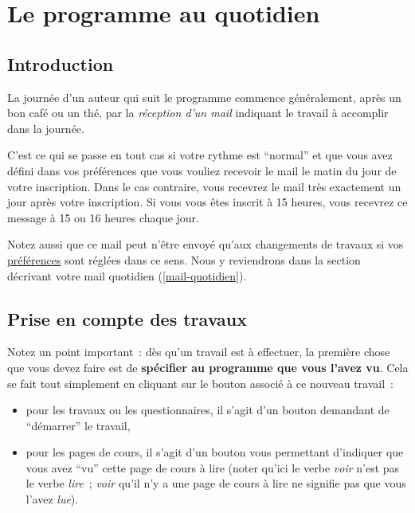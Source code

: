 % 
% 
% 
% 
% 
% 
% 
% 

\chapter{Le programme au quotidien}\hypertarget{programme-quotidien}{}\label{programme-quotidien}

\section{Introduction}\hypertarget{introduction}{}\label{introduction}

La journée d'un auteur qui suit le programme \unan{} commence généralement, après un bon café ou un thé, par la \emph{réception d'un mail} indiquant le travail à accomplir dans  la journée.

C'est ce qui se passe en tout cas si votre rythme est “normal” et que vous avez défini dans vos préférences que vous vouliez recevoir le mail le matin du jour de votre inscription. Dans le cas contraire, vous recevrez le mail très exactement un jour après votre inscription. Si vous vous êtes inscrit à 15 heures, vous recevrez ce message à 15 ou 16 heures chaque jour.

Notez aussi que ce mail peut n'être envoyé qu'aux changements de travaux si vos \hyperlink{preferences-auteur}{préférences} sont réglées dans ce sens. Nous y reviendrons dans la section décrivant votre mail quotidien (\ref{mail-quotidien}).

\section{Prise en compte des travaux}\hypertarget{prise-en-compte-des-travaux}{}\label{prise-en-compte-des-travaux}

Notez un point important~{}: dès qu'un travail est à effectuer, la première chose que vous devez faire est de \textbf{spécifier au programme que vous l'avez vu}. Cela se fait tout simplement en cliquant sur le bouton associé à ce nouveau travail~{}:

\begin{itemize}
\item pour les travaux ou les questionnaires, il s'agit d'un bouton demandant de “démarrer” le travail,
\item pour les pages de cours, il s'agit d'un bouton vous permettant d'indiquer que vous avez “vu” cette page de cours à lire (noter qu'ici le verbe \emph{voir} n'est pas le verbe \emph{lire}~{}; \emph{voir} qu'il n'y a une page de cours à lire ne signifie pas que vous l'avez \emph{lue}).
\end{itemize}
